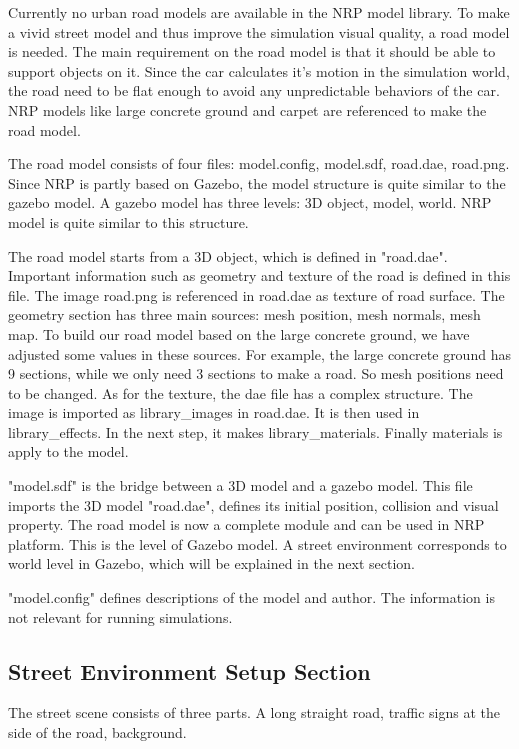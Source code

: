 Currently no urban road models are available in the NRP model library. To make a vivid street model and thus improve the simulation visual quality, a road model is needed. The main requirement on the road model is that it should be able to support objects on it. Since the car calculates it's motion in the simulation world, the road need to be flat enough to avoid any unpredictable behaviors of the car. NRP models like large concrete ground and carpet are referenced to make the road model.


The road model consists of four files: model.config, model.sdf, road.dae, road.png. Since NRP is partly based on Gazebo, the model structure is quite similar to the gazebo model. A gazebo model has three levels: 3D object, model, world. NRP model is quite similar to this structure. 


The road model starts from a 3D object, which is defined in "road.dae". Important information such as geometry and texture of the road is defined in this file. The image road.png is referenced in road.dae as texture of road surface. The geometry section has three main sources: mesh position, mesh normals, mesh map. To build our road model based on the large concrete ground, we have adjusted some values in these sources. For example, the large concrete ground has 9 sections, while we only need 3 sections to make a road. So mesh positions need to be changed. As for the texture, the dae file has a complex structure. The image is imported as library\_images in road.dae. It is then used in library\_effects. In the next step, it makes library\_materials. Finally materials is apply to the model. 


"model.sdf" is the bridge between a 3D model and a gazebo model. This file imports the 3D model "road.dae", defines its initial position, collision and visual property. The road model is now a complete module and can be used in NRP platform. This is the level of Gazebo model. A street environment corresponds to world level in Gazebo, which will be explained in the next section.

"model.config" defines descriptions of the model and author. The information is not relevant for running simulations. 

\subsection{Street Environment Setup Section}
The street scene consists of three parts. A long straight road, traffic signs at the side of the road, background.

